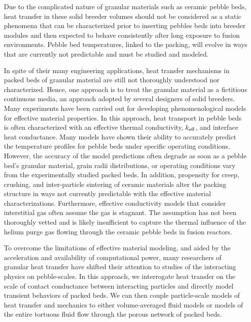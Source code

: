 Due to the complicated nature of granular materials such as ceramic pebble beds, heat transfer in these solid breeder volumes should not be considered as a static phenomena that can be characterized prior to inserting pebbles beds into breeder modules and then expected to behave consistently after long exposure to fusion environments. Pebble bed temperatures, linked to the packing, will evolve in ways that are currently not predictable and must be studied and modeled.

In spite of their many engineering applications, heat transfer mechanisms in packed beds of granular material are still not thoroughly understood nor characterized. Hence, one approach is to treat the granular material as a fictitious continuous media, an approach adopted by several designers of solid breeders. Many experiments have been carried out for developing phenomenological models for effective material properties. In this approach, heat transport in pebble beds is often characterized with an effective thermal conductivity, $k_\text{eff}$, and interface heat conductance. Many models have shown their ability to accurately predict the temperature profiles for pebble beds under specific operating conditions. However, the accuracy of the model predictions often degrade as soon as a pebble bed's granular material, grain radii distributions, or operating conditions vary from the experimentally studied packed beds. In addition, propensity for creep, crushing, and inter-particle sintering of ceramic materials alter the packing structure in ways not currently predictable with the effective material characterizations. Furthermore, effective conductivity models that consider interstitial gas often assume the gas is stagnant. The assumption has not been thoroughly vetted and is likely insufficient to capture the thermal influence of the helium purge gas flowing through the ceramic pebble beds in fusion reactors.

To overcome the limitations of effective material modeling, and aided by the acceleration and availability of computational power, many researchers of granular heat transfer have shifted their attention to studies of the interacting physics on pebble-scales. In this approach, we interrogate heat transfer on the scale of contact conductance between interacting particles and directly model transient behaviors of packed beds. We can then couple particle-scale models of heat transfer and mechanics to either volume-averaged fluid models or models of the entire tortuous fluid flow through the porous network of packed beds.


